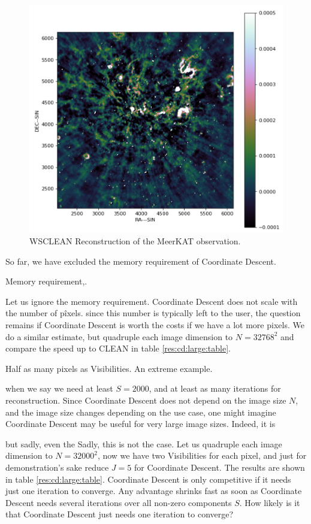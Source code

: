 \begin{figure}[h]
	\centering
	\includegraphics[width=0.6\linewidth]{./chapters/20.results/meerkat.png}
	\caption{WSCLEAN Reconstruction of the MeerKAT observation.}
	\label{scale:wsclean}
\end{figure}

So far, we have excluded the memory requirement of Coordinate Descent. 

Memory requirement,.


Let us ignore the memory requirement. Coordinate Descent does not scale with the number of pîxels. since this number is typically left to the user, the question remains if Coordinate Descent is worth the costs if we have a lot more pixels. We do a similar estimate, but quadruple each image dimension to $N=32768^2$ and compare the speed up to CLEAN in table \ref{res:cd:large:table}. 

Half as many pixels as Visibilities. An extreme example.


   when we say we need at least $S=2000$, and at least as many iterations for reconstruction. Since Coordinate Descent does not depend on the image size $N$, and the image size changes depending on the use case, one might imagine Coordinate Descent may be useful for very large image sizes. Indeed, it is

   but sadly, even the  Sadly, this is not the case. Let us quadruple each image dimension to $N=32000^2$, now we have two Visibilities for each pixel, and just for demonstration's sake reduce $J=5$ for Coordinate Descent. The results are shown in table \ref{res:cd:large:table}. Coordinate Descent is only competitive if it needs just one iteration to converge. Any advantage shrinks fast as soon as Coordinate Descent needs several iterations over all non-zero components $S$. How likely is it that Coordinate Descent just needs one iteration to converge?

